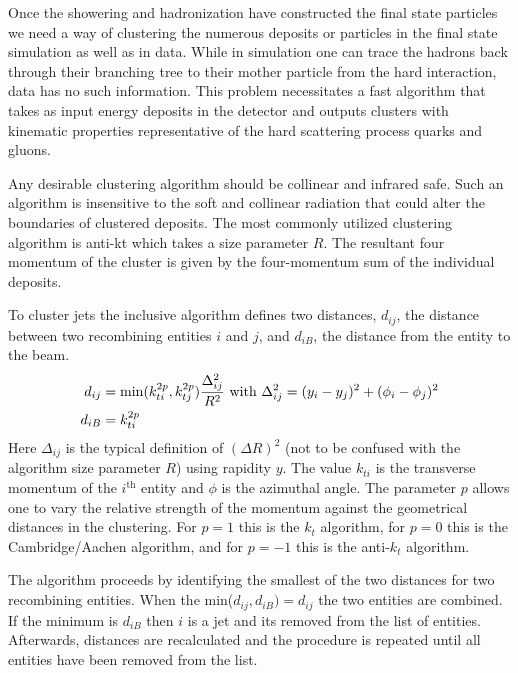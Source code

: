 Once the showering and hadronization have constructed the final state particles we need a way of clustering the numerous deposits or
particles in the final state simulation as well as in data. While in simulation one can trace the
 hadrons back through their branching tree to their mother particle from the hard interaction,
data has no such information. This problem necessitates a fast algorithm that takes as input energy deposits in the 
detector and outputs clusters with kinematic properties representative of the hard scattering process quarks and gluons. 

Any desirable clustering algorithm should be collinear and infrared safe. Such an algorithm is insensitive
to the soft and collinear radiation that could alter the boundaries of clustered deposits. The most commonly utilized clustering 
algorithm is anti-kt \cite{Cacciari:2008gp} which takes a size parameter $R$.  The resultant four momentum 
of the cluster is given by the four-momentum sum of the individual deposits. 

To cluster jets the inclusive algorithm defines two distances, $d_{ij}$, the distance between two recombining
entities $i$ and $j$, and $d_{iB}$, the distance from the entity to the beam. 
\begin{align*}
d_{ij} &= \text{\textrm{min}}(k_{ti}^{2p}, k_{tj}^{2p}) \frac{\Delta_{ij}^2}{R^2} \text{ with } \Delta_{ij}^2 = (y_i - y_j)^2 + (\phi_i - \phi_j)^2\\
d_{iB} &= k_{ti}^{2p} 
\end{align*}
Here $\Delta_{ij}$ is the typical definition of $(\Delta R)^2$ (not to be confused with the algorithm 
size parameter $R$) using rapidity $y$. The value $k_{ti}$ is the transverse momentum of
the $i^{\textrm{th}}$ entity and $\phi$ is the azimuthal angle. The parameter $p$ allows one 
to vary the relative strength of the momentum against the geometrical
distances in the clustering. For $p=1$ this is the $k_t$ algorithm, 
for $p=0$ this is the Cambridge/Aachen algorithm, and for $p=-1$ this is the anti-$k_t$ algorithm. 

The algorithm proceeds by identifying the smallest of the two distances for two recombining entities. When the
 min($d_{ij},d_{iB})=d_{ij}$ the two entities are combined. If the minimum is $d_{iB}$ then $i$ is a jet
 and its removed from the list
of entities. Afterwards, distances are recalculated and the procedure is repeated until all entities have been
removed from the list. 

